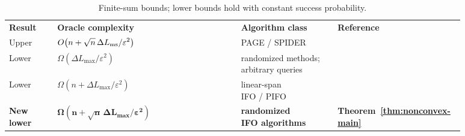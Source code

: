 \documentclass{article}
\theoremstyle{definition}
\begin{document}
\begingroup
\hfuzz=2pt
\begin{table}[t]
\caption{Finite-sum bounds; lower bounds hold with constant success
probability.}
\label{tab:complexity}
\centering
\footnotesize
\setlength{\tabcolsep}{2.5pt}
\renewcommand{\arraystretch}{1.10}

\begin{tabular}{|>{\centering\arraybackslash}m{0.105\linewidth}|>{\centering\arraybackslash}m{0.385\linewidth}|>{\centering\arraybackslash}m{0.205\linewidth}|>{\centering\arraybackslash}m{0.19\linewidth}|}
\hline
\multicolumn{4}{|l|}{\cellcolor{black!5}\textbf{Nonconvex stationarity}} \\
\hline
\rowcolor{black!2}
\textbf{Result} & \textbf{Oracle complexity}
& \textbf{Algorithm class} & \textbf{Reference} \\
\hline
Upper
& $\displaystyle O\!\left(n+\sqrt n\,\Delta L_{\rm ms}/\varepsilon^2\right)$
& PAGE / SPIDER
& \citealp{fang2018spider,li2021page} \\
\hline
Lower
& $\displaystyle \Omega\!\left(\Delta L_{\max}/\varepsilon^2\right)$
& \shortstack{randomized methods;\\arbitrary queries}
& \citealp{emmenegger2022oracle} \\
\hline
Lower
& $\displaystyle \Omega\!\left(n+\Delta L_{\max}/\varepsilon^2\right)$
& \shortstack{linear-span\\IFO / PIFO}
& \citealp{zhou2019lower,han2024lower} \\
\hline
\rowcolor{black!5}
\shortstack{\textbf{New}\\[-2pt]{\scriptsize\bfseries lower}}
& $\displaystyle \boldsymbol{\Omega\!\left(n+\sqrt n\,\Delta L_{\max}/\varepsilon^2\right)}$
& \shortstack{\textbf{randomized}\\\textbf{IFO algorithms}}
& \textbf{Theorem~\ref{thm:nonconvex-main}} \\
\hline
\end{tabular}

\vspace{3pt}


\end{table}
\end{document}
